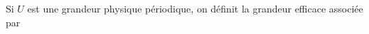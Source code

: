 \documentclass[a4paper]{article}
\begin{document}
\pagestyle{fancy}
\fancyhf{}
\setlength{\headheight}{15pt}

\begin{center}
	\large{}
\end{center}


Si \(U\) est une grandeur physique périodique, on définit la grandeur efficace associée par 
\end{document}
